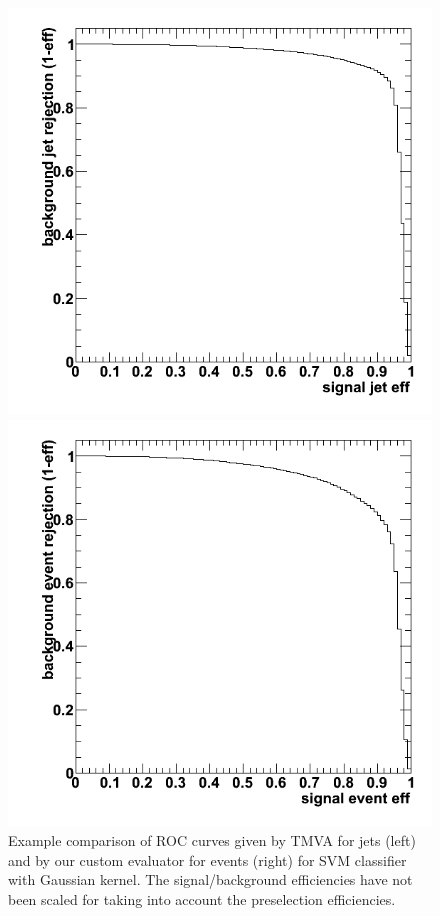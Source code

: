 \begin{figure}[h]
  \begin{center}
    \begin{minipage}{.3\textwidth}
      \includegraphics[width=\textwidth]{images/mkRocTmvaSvm}
    \end{minipage}
    \hspace{.02\textwidth}
    \begin{minipage}{.3\textwidth}
      \includegraphics[width=\textwidth]{images/mkRocEventSvm}
    \end{minipage}
  \end{center}
  \caption{Example comparison of ROC curves given by TMVA for jets
    (left) and by our custom evaluator for events (right) for SVM
    classifier with Gaussian kernel. The signal/background
    efficiencies have not been scaled for taking into account the
    preselection efficiencies.}
  \label{fig:mkRocTmvaEvent}
\end{figure}

